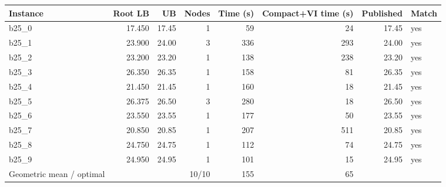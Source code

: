 \begin{tabular}{lrrrrrrl}
\toprule
Instance & Root LB & UB & Nodes & Time (s) & Compact+VI time (s) & Published & Match \\
\midrule
b25\_0 & 17.450 & 17.45 & 1 & 59 & 24 & 17.45 & yes \\
b25\_1 & 23.900 & 24.00 & 3 & 336 & 293 & 24.00 & yes \\
b25\_2 & 23.200 & 23.20 & 1 & 138 & 238 & 23.20 & yes \\
b25\_3 & 26.350 & 26.35 & 1 & 158 & 81 & 26.35 & yes \\
b25\_4 & 21.450 & 21.45 & 1 & 160 & 18 & 21.45 & yes \\
b25\_5 & 26.375 & 26.50 & 3 & 280 & 18 & 26.50 & yes \\
b25\_6 & 23.550 & 23.55 & 1 & 177 & 50 & 23.55 & yes \\
b25\_7 & 20.850 & 20.85 & 1 & 207 & 511 & 20.85 & yes \\
b25\_8 & 24.750 & 24.75 & 1 & 112 & 74 & 24.75 & yes \\
b25\_9 & 24.950 & 24.95 & 1 & 101 & 15 & 24.95 & yes \\
\midrule
Geometric mean / optimal & & & 10/10 & 155 & 65 & & \\
\bottomrule
\end{tabular}
